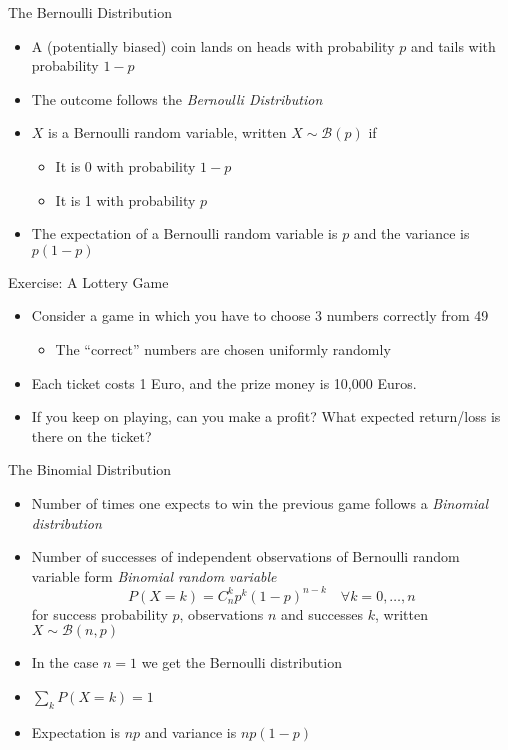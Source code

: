 \documentclass{beamer}
\begin{document}
\begin{frame}{The Bernoulli Distribution}
\begin{itemize}
 \item A (potentially biased) coin lands on heads with probability $p$ and tails with probability $1-p$
\item The outcome follows the \emph{Bernoulli Distribution} 
\item $X$ is a Bernoulli random variable, written $X \sim \mathcal{B}(p)$ if 
\begin{itemize}
\item It is 0 with probability $1-p$ 
\item It is 1 with probability $p$ 
\end{itemize} 
\item The expectation of a Bernoulli random variable is $p$ and the variance is $p(1-p)$
\end{itemize}
\end{frame}


\begin{frame}{Exercise: A Lottery Game}  
\begin{itemize} 
\item Consider a game in which you have to choose 3 numbers correctly from 49 
\begin{itemize}
\item The ``correct'' numbers are chosen uniformly randomly 
\end{itemize}
\item Each ticket costs 1 Euro, and the prize money is 10,000 Euros. 
\item If you keep on playing, can you make a profit? What expected return/loss is there on the ticket?
\end{itemize}
\end{frame}

\begin{frame}{The Binomial Distribution} 
\begin{itemize} 
 \item Number of times one expects to win the previous game follows a \emph{Binomial distribution}  
\item Number of successes of independent observations of Bernoulli random variable form \emph{Binomial random variable} 
\begin{displaymath} 
 P(X = k) = C^k_n p^k (1-p)^{n-k} \quad \forall k = 0, \ldots, n
\end{displaymath}
for success probability $p$, observations $n$ and successes $k$, written $X \sim \mathcal{B}(n, p)$ 
\item In the case $n=1$ we get the Bernoulli distribution 
\item $\sum_k P(X = k) = 1$  
\item Expectation is $np$ and variance is $np(1-p)$
\end{itemize}
\end{frame}
\end{document}
